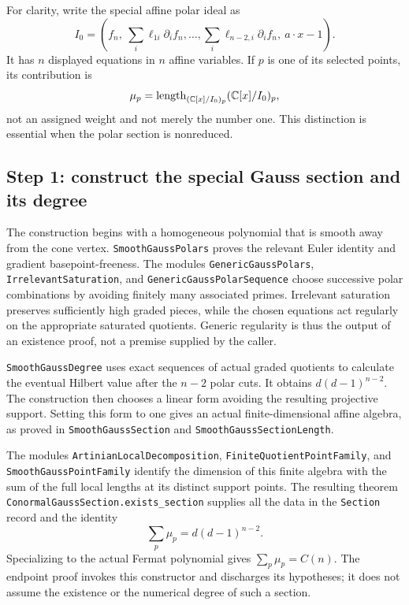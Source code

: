 For clarity, write the special affine polar ideal as
\[
 I_0=\left(f_n,\
 \sum_i\ell_{1i}\partial_i f_n,\ldots,
 \sum_i\ell_{n-2,i}\partial_i f_n,\ a\cdot x-1\right).
\]
It has $n$ displayed equations in $n$ affine variables.  If $p$ is one of
its selected points, its contribution is
\[
 \mu_p=\operatorname{length}_{(\mathbb{C}[x]/I_0)_p}
                  (\mathbb{C}[x]/I_0)_p,
\]
not an assigned weight and not merely the number one.  This distinction
is essential when the polar section is nonreduced.

\subsection{Step 1: construct the special Gauss section and its degree}
\label{app:lean-special}

The construction begins with a homogeneous polynomial that is smooth away
from the cone vertex.  \nolinkurl{SmoothGaussPolars} proves the relevant
Euler identity and gradient basepoint-freeness.  The modules
\nolinkurl{GenericGaussPolars}, \nolinkurl{IrrelevantSaturation}, and
\nolinkurl{GenericGaussPolarSequence} choose successive polar combinations
by avoiding finitely many associated primes.  Irrelevant saturation preserves
sufficiently high graded pieces, while the chosen equations act regularly
on the appropriate saturated quotients.  Generic regularity is thus the
output of an existence proof, not a premise supplied by the caller.

\nolinkurl{SmoothGaussDegree} uses exact sequences of actual graded
quotients to calculate the eventual Hilbert value after the $n-2$ polar
cuts.  It obtains $d(d-1)^{n-2}$.  The construction then chooses a linear
form avoiding the resulting projective support.  Setting this form to one
gives an actual finite-dimensional affine algebra, as proved in
\nolinkurl{SmoothGaussSection} and \nolinkurl{SmoothGaussSectionLength}.

The modules \nolinkurl{ArtinianLocalDecomposition},
\nolinkurl{FiniteQuotientPointFamily}, and
\nolinkurl{SmoothGaussPointFamily} identify the dimension of this finite
algebra with the sum of the full local lengths at its distinct support
points.  The resulting theorem
\nolinkurl{ConormalGaussSection.exists_section} supplies all the data in
the \nolinkurl{Section} record and the identity
\[
 \sum_p\mu_p=d(d-1)^{n-2}.
\]
Specializing to the actual Fermat polynomial gives $\sum_p\mu_p=C(n)$.
The endpoint proof invokes this constructor and discharges its hypotheses;
it does not assume the existence or the numerical degree of such a section.


